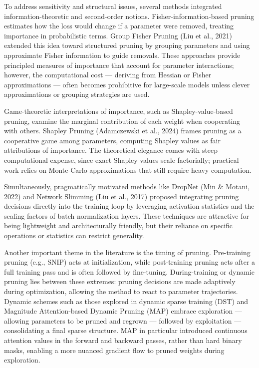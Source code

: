 \documentclass[12pt,a4paper]{report}
\begin{document}
To address sensitivity and structural issues, several methods integrated information-theoretic and second-order notions. Fisher-information-based pruning estimates how the loss would change if a parameter were removed, treating importance in probabilistic terms. Group Fisher Pruning (Liu et al., 2021) extended this idea toward structured pruning by grouping parameters and using approximate Fisher information to guide removals. These approaches provide principled measures of importance that account for parameter interactions; however, the computational cost — deriving from Hessian or Fisher approximations — often becomes prohibitive for large-scale models unless clever approximations or grouping strategies are used.

Game-theoretic interpretations of importance, such as Shapley-value-based pruning, examine the marginal contribution of each weight when cooperating with others. Shapley Pruning (Adamczewski et al., 2024) frames pruning as a cooperative game among parameters, computing Shapley values as fair attributions of importance. The theoretical elegance comes with steep computational expense, since exact Shapley values scale factorially; practical work relies on Monte-Carlo approximations that still require heavy computation.

Simultaneously, pragmatically motivated methods like DropNet (Min \& Motani, 2022) and Network Slimming (Liu et al., 2017) proposed integrating pruning decisions directly into the training loop by leveraging activation statistics and the scaling factors of batch normalization layers. These techniques are attractive for being lightweight and architecturally friendly, but their reliance on specific operations or statistics can restrict generality.

Another important theme in the literature is the timing of pruning. Pre-training pruning (e.g., SNIP) acts at initialization, while post-training pruning acts after a full training pass and is often followed by fine-tuning. During-training or dynamic pruning lies between these extremes: pruning decisions are made adaptively during optimization, allowing the method to react to parameter trajectories. Dynamic schemes such as those explored in dynamic sparse training (DST) and Magnitude Attention-based Dynamic Pruning (MAP) embrace exploration — allowing parameters to be pruned and regrown — followed by exploitation — consolidating a final sparse structure. MAP in particular introduced continuous attention values in the forward and backward passes, rather than hard binary masks, enabling a more nuanced gradient flow to pruned weights during exploration.
\end{document}
